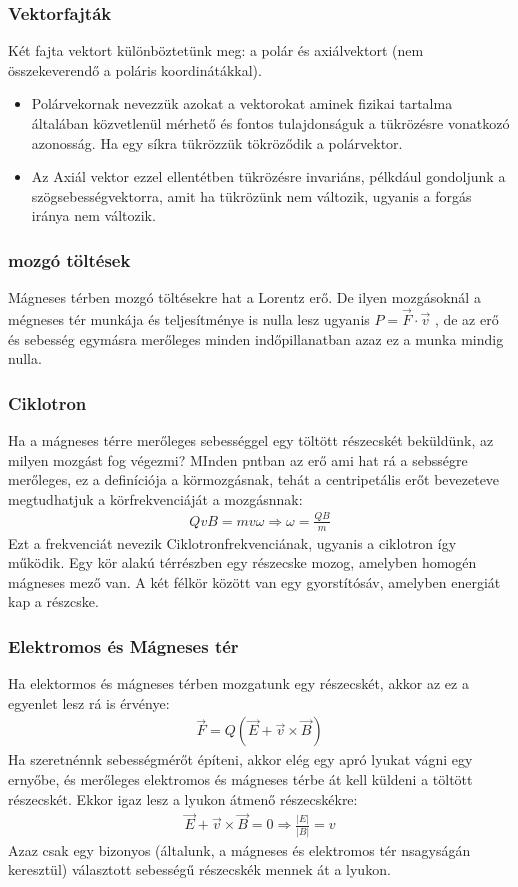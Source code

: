 \documentclass{article}
\begin{document}
\subsubsection{Vektorfajták}
Két fajta vektort különböztetünk meg: a polár és axiálvektort (nem összekeverendő a poláris koordinátákkal). 
\begin{itemize}
\item Polárvekornak nevezzük azokat a vektorokat aminek fizikai tartalma általában közvetlenül mérhető és fontos tulajdonságuk a tükrözésre vonatkozó azonosság. Ha egy síkra tükrözzük tökröződik a polárvektor.
\item Az Axiál vektor ezzel ellentétben tükrözésre invariáns, pélkdául gondoljunk a szögsebességvektorra, amit ha tükrözünk nem változik, ugyanis a forgás iránya nem változik. 
\end{itemize}
\subsubsection{mozgó töltések}
Mágneses térben mozgó töltésekre hat a Lorentz erő. De ilyen mozgásoknál a mégneses tér munkája és teljesítménye is nulla lesz ugyanis $P=\vec{F} \cdot \vec{v}$ , de az erő és sebesség egymásra merőleges minden indőpillanatban azaz ez a munka mindig nulla.
\subsubsection{Ciklotron}
Ha a mágneses térre merőleges sebességgel egy töltött részecskét beküldünk, az milyen mozgást fog végezmi?
MInden pntban az erő ami hat rá a sebsségre merőleges, ez a definíciója a körmozgásnak, tehát a centripetális erőt bevezeteve megtudhatjuk a körfrekvenciáját a mozgásnnak:
\begin{gather*}
QvB=mv\omega \Rightarrow \omega = \frac{QB}{m} 
\end{gather*}
Ezt a frekvenciát nevezik Ciklotronfrekvenciának, ugyanis a ciklotron így működik. Egy kör alakú térrészben egy részecske mozog, amelyben homogén mágneses mező van. A két félkör között van egy gyorstítósáv, amelyben energiát kap a részcske.
\subsubsection{Elektromos és Mágneses tér}
Ha elektormos és mágneses térben mozgatunk egy részecskét, akkor az ez a egyenlet lesz rá is érvénye:
\begin{gather*}
\vec{F} = Q(\vec{E} + \vec{v} \times \vec{B})
\end{gather*}
Ha szeretnénnk sebességmérőt építeni, akkor elég egy apró lyukat vágni egy ernyőbe, és merőleges elektromos és mágneses térbe át kell küldeni a töltött részecskét. Ekkor igaz lesz a lyukon átmenő részecskékre:
\begin{gather*}
\vec{E} + \vec{v} \times \vec{B} = 0 \Rightarrow \frac{|E|}{|B|} = v
\end{gather*}
Azaz csak egy  bizonyos (általunk, a mágneses és elektromos tér nsagyságán keresztül) választott sebességű részecskék mennek át a lyukon.
\end{document}

